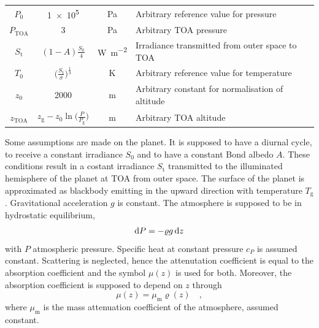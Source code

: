 \documentclass[a4paper,10pt,twocolumn,\classoptions]{article}
\newcommand{\zTOA}{z_\text{TOA}}
\newcommand{\PTOA}{P_\text{TOA}}
\begin{document}
\begin{table}[h]
\begin{tabular}[b]{cccp{}}
    $P_0$             & \num{1e5}                                                              & \unit{\pascal}                                    & Arbitrary reference value for pressure                                                    \\
    $\PTOA$           & \num{3}                                                                & \unit{\pascal}                                    & Arbitrary TOA pressure                                                                    \\
    $S_\text{t}$      & $(1 - A) \frac{S_0}{4}$                                                & \unit{\watt\per\square\metre}                     & Irradiance transmitted from outer space to TOA                                            \\
    $T_0$             & $\big( \frac{S_\text{t}}{\sigma} \big)^\frac{1}{4}$                    & \unit{\kelvin}                                    & Arbitrary reference value for temperature                                                 \\
    $z_0$             & \num{2000}                                                             & \unit{\metre}                                     & Arbitrary constant for normalisation of altitude                                          \\
    $\zTOA$           & $z_\text{g} - z_0 \ln{\Big( \frac{P}{P_\text{g}} \Big)}$               & \unit{\metre}                                     & Arbitrary TOA altitude                                                                    \\
    \bottomrule
  \end{tabular}
\end{table}

Some assumptions are made on the planet.
It is supposed to have a diurnal cycle, to receive a constant irradiance $S_0$ and to have a constant Bond albedo $A$. These conditions result in a costant irradiance $S_\text{t}$ transmitted to the illuminated hemisphere of the planet at TOA from outer space.
The surface of the planet is approximated as blackbody emitting in the upward direction with temperature $T_\text{g}$.
Gravitational acceleration $g$ is constant.
The atmosphere is supposed to be in hydrostatic equilibrium,
\begin{equation}
  \label{eq:hydrostatic_equilibrium}
  \odif{P} = - \varrho g \odif{z}
\end{equation}
with $P$ atmospheric pressure.
Specific heat at constant pressure $c_P$ is assumed constant.
Scattering is neglected, hence the attenutation coefficient is equal to the absorption coefficient and the symbol $\mu(z)$ is used for both.
Moreover, the absorption coefficient is supposed to depend on $z$ through
\begin{equation}
  \label{eq:absorption coefficient}
  \mu(z) = \mu_\text{m} \varrho(z)
  \quad ,
\end{equation}
where $\mu_\text{m}$ is the mass attenuation coefficient of the atmosphere, assumed constant.
\end{document}
